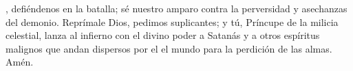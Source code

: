 , defiéndenos en la batalla; sé nuestro amparo contra la perversidad y asechanzas del demonio. Reprímale Dios, pedimos
suplicantes; y tú, Príncupe de la milicia celestial, lanza al infierno con el divino poder a Satanás y a otros espíritus malignos que andan dispersos por el
el mundo para la perdición de las almas. Amén.